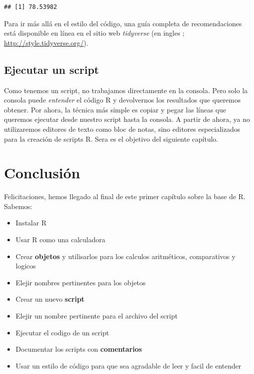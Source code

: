 \documentclass[
]{book}
\providecommand{\tightlist}{%
  \setlength{\itemsep}{0pt}\setlength{\parskip}{0pt}}
\begin{document}
\begin{verbatim}
## [1] 78.53982
\end{verbatim}

Para ir más allá en el estilo del código, una guía completa de recomendaciones está disponible en línea en el sitio web \emph{tidyverse} (en ingles ; \url{http://style.tidyverse.org/}).

\hypertarget{ejecutar-un-script}{%
\subsection{Ejecutar un script}\label{ejecutar-un-script}}

Como tenemos un script, no trabajamos directamente en la consola. Pero solo la consola puede \emph{entender} el código R y devolvernos los resultados que queremos obtener. Por ahora, la técnica más simple es copiar y pegar las líneas que queremos ejecutar desde nuestro script hasta la consola. A partir de ahora, ya no utilizaremos editores de texto como bloc de notas, sino editores especializados para la creación de scripts R. Sera es el objetivo del siguiente capítulo.

\hypertarget{conclusiuxf3n}{%
\section{Conclusión}\label{conclusiuxf3n}}

Felicitaciones, hemos llegado al final de este primer capítulo sobre la base de R. Sabemos:

\begin{itemize}
\tightlist
\item
  Instalar R
\item
  Usar R como una calculadora
\item
  Crear \textbf{objetos} y utilisarlos para los calculos aritméticos, comparativos y logicos
\item
  Elejir nombres pertinentes para los objetos
\item
  Crear un nuevo \textbf{script}
\item
  Elejir un nombre pertinente para el archivo del script
\item
  Ejecutar el codigo de un script
\item
  Documentar los scripts con \textbf{comentarios}
\item
  Usar un estilo de código para que sea agradable de leer y facil de entender
\end{itemize}
\end{document}
